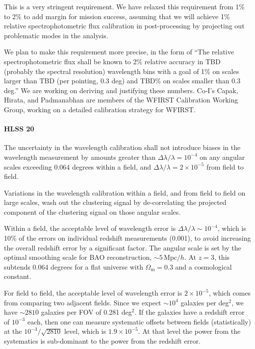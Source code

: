 This is a very stringent requirement. We have relaxed this requirement from 1\%
 to 2\% to add margin for mission success, assuming that we will achieve 1\%
 relative spectrophotometric flux calibration in post-processing by projecting
 out problematic modes in the analysis.

 We plan to make this requirement more precise, in the form of ``The relative
 spectrophotometric flux shall be known to 2\% relative accuracy in TBD (probably
 the spectral resolution) wavelength bins with a goal of 1\% on scales larger
 than TBD (per pointing, 0.3 deg) and TBD\% on scales smaller than 0.3 deg.''
 We are working on deriving and justifying these numbers.
 Co-I's Capak, Hirata, and Padmanabhan are members of the WFIRST Calibration Working Group, working on a detailed calibration strategy for WFIRST.


\paragraph{HLSS 20} The uncertainty in the wavelength calibration shall not introduce biases in the wavelength measurement by amounts greater than
 $\Delta\lambda/\lambda = 10^{-4}$ on any
 angular scales exceeding 0.064 degrees within a field, and
 $\Delta\lambda/\lambda = 2\times10^{-5}$ from
 field to field.

 Variations in the wavelength calibration within a field, and from field to field
 on large scales, wash out the clustering signal by de-correlating the projected
 component of the clustering signal on those angular scales.

 Within a field, the acceptable level of wavelength error is
 $\Delta\lambda/\lambda \sim 10^{-4}$, which
 is 10\% of the errors on individual redshift measurements (0.001), to avoid
 increasing the overall redshift error by a significant factor. The angular scale
 is set by the optimal smoothing scale for BAO reconstruction, $\sim 5 \,
 \mathrm{Mpc}/h$. At $z=3$, this subtends 0.064 degrees for a flat universe with
 $\Omega_\mathrm{m}=0.3$ and a cosmological constant.

 For field to field, the acceptable level of wavelength error is $2\times10^{-5}$, which comes from comparing two adjacent fields.
Since we expect $\sim 10^4$ galaxies per deg$^2$, we have $\sim 2810$ galaxies per FOV of 0.281 deg$^2$.  If the galaxies have a redshift error of $10^{-3}$ each, then one can measure systematic offsets between fields (statistically) at the $10^{-3}/\sqrt{2810}$ level, which is $1.9\times10^{-5}$. At that level the power from the systematics is sub-dominant to the power from the redshift error.

